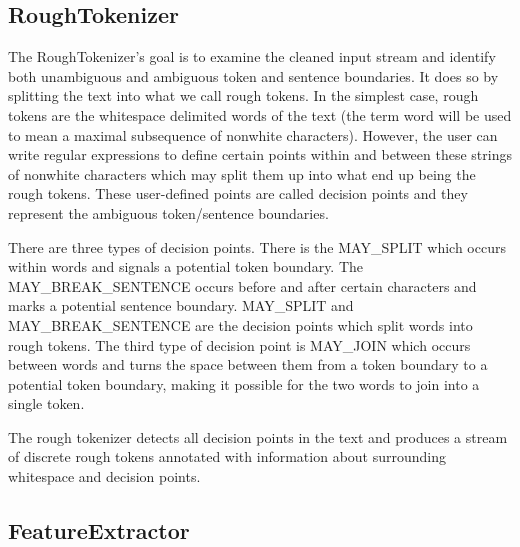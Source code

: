 \subsection{RoughTokenizer}

The RoughTokenizer's goal is to examine the cleaned input stream and identify
both unambiguous and ambiguous token and sentence boundaries. It does so by
splitting the text into what we call rough tokens. In the simplest case, rough
tokens are the whitespace delimited words of the text (the term word will be
used to mean a maximal subsequence of nonwhite characters). However, the user
can write regular expressions to define certain points within and between these
strings of nonwhite characters which may split them up into what end up being
the rough tokens. These user-defined points are called decision points and they
represent the ambiguous token/sentence boundaries.

There are three types of decision points. There is the MAY\_SPLIT which occurs
within words and signals a potential token boundary. The MAY\_BREAK\_SENTENCE
occurs before and after certain characters and marks a potential sentence
boundary. MAY\_SPLIT and MAY\_BREAK\_SENTENCE are the decision points which
split words into rough tokens. The third type of decision point is MAY\_JOIN
which occurs between words and turns the space between them from a token
boundary to a potential token boundary, making it possible for the two words to
join into a single token.

The rough tokenizer detects all decision points in the text and produces a
stream of discrete rough tokens annotated with information about surrounding
whitespace and decision points.

\subsection{FeatureExtractor}


